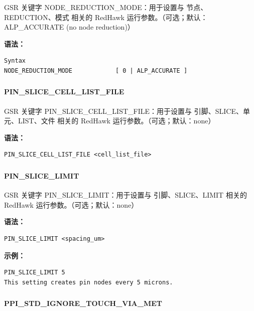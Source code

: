 GSR 关键字 NODE_REDUCTION_MODE：用于设置与 节点、REDUCTION、模式 相关的 RedHawk 运行参数。（可选；默认：ALP_ACCURATE (no node reduction)）

\textbf{语法：}
\begin{lstlisting}
Syntax
NODE_REDUCTION_MODE            [ 0 | ALP_ACCURATE ]
\end{lstlisting}

\subsubsection{}
\paragraph*{PIN_SLICE_CELL_LIST_FILE}

GSR 关键字 PIN_SLICE_CELL_LIST_FILE：用于设置与 引脚、SLICE、单元、LIST、文件 相关的 RedHawk 运行参数。（可选；默认：none）

\textbf{语法：}
\begin{lstlisting}
PIN_SLICE_CELL_LIST_FILE <cell_list_file>
\end{lstlisting}

\subsubsection{}
\paragraph*{PIN_SLICE_LIMIT}

GSR 关键字 PIN_SLICE_LIMIT：用于设置与 引脚、SLICE、LIMIT 相关的 RedHawk 运行参数。（可选；默认：none）

\textbf{语法：}
\begin{lstlisting}
PIN_SLICE_LIMIT <spacing_um>
\end{lstlisting}

\textbf{示例：}
\begin{lstlisting}
PIN_SLICE_LIMIT 5
This setting creates pin nodes every 5 microns.
\end{lstlisting}

\subsubsection{}
\paragraph*{PPI_STD_IGNORE_TOUCH_VIA_MET}

